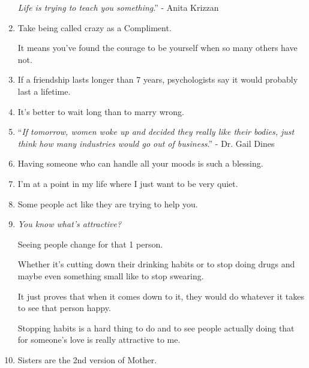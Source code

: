 \documentclass{article}
\begin{document}
\begin{enumerate}
	\textit{Life is trying to teach you something}.'' - Anita Krizzan
	\item Take being called crazy as a Compliment.
	
	It means you've found the courage to be yourself when so many others have not.
	\item If a friendship lasts longer than 7 years, psychologists say it would probably last a lifetime.
	\item It's better to wait long than to marry wrong.
	\item ``\textit{If tomorrow, women woke up and decided they really like their bodies, just think how many industries would go out of business}.'' - Dr. Gail Dines
	\item Having someone who can handle all your moods is such a blessing.
	\item I'm at a point in my life where I just want to be very quiet.
	\item Some people act like they are trying to help you.
	\item \textit{You know what's attractive?}
	
	Seeing people change for that 1 person.
	
	Whether it's cutting down their drinking habits or to stop doing drugs and maybe even something small like to stop swearing.
	
	It just proves that when it comes down to it, they would do whatever it takes to see that person happy.
	
	Stopping habits is a hard thing to do and to see people actually doing that for someone's love is really attractive to me.
	\item Sisters are the 2nd version of Mother.
	

\end{enumerate}
\end{document}
